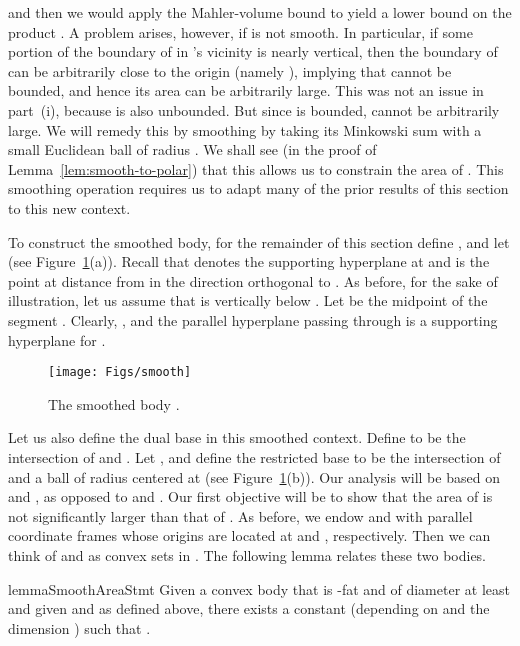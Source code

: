 \documentclass[11pt]{article}   \usepackage[letterpaper,hmargin=2.1cm,vmargin=3cm]{geometry}
\begin{document}
and then we would apply the Mahler-volume bound to yield a lower bound on the product . A problem arises, however, if  is not smooth. In particular, if some portion of the boundary of  in 's vicinity is nearly vertical, then the boundary of  can be arbitrarily close to the origin (namely ), implying that  cannot be bounded, and hence its area can be arbitrarily large. This was not an issue in part~(i), because  is also unbounded. But since  is bounded,  cannot be arbitrarily large. We will remedy this by smoothing  by taking its Minkowski sum with a small Euclidean ball of radius . We shall see (in the proof of Lemma~\ref{lem:smooth-to-polar}) that this allows us to constrain the area of . This smoothing operation requires us to adapt many of the prior results of this section to this new context.

To construct the smoothed body, for the remainder of this section define , and let  (see Figure~\ref{fig:smooth}(a)). Recall that  denotes the supporting hyperplane at  and  is the point at distance  from  in the direction orthogonal to . As before, for the sake of illustration, let us assume that  is vertically below . Let  be the midpoint of the segment . Clearly, , and the parallel hyperplane  passing through  is a supporting hyperplane for .

\begin{figure}[htbp]
  \centerline{\texttt{[image: Figs/smooth]}}
  \caption{The smoothed body .}
  \label{fig:smooth}
\end{figure}


Let us also define the dual base in this smoothed context. Define  to be the intersection of  and . Let , and define the restricted base  to be the intersection of  and a ball of radius  centered at  (see Figure~\ref{fig:smooth}(b)). Our analysis will be based on  and , as opposed to  and . Our first objective will be to show that the area of  is not significantly larger than that of . As before, we endow  and  with parallel coordinate frames whose origins are located at  and , respectively. Then we can think of  and  as convex sets in . The following lemma relates these two bodies.

\begin{restatable}{lemma}{SmoothAreaStmt}\label{lem:smooth-area}
Given a convex body  that is -fat and of diameter at least  and given  and  as defined above, there exists a constant  (depending on  and the dimension ) such that .
\end{restatable}
\end{document}
